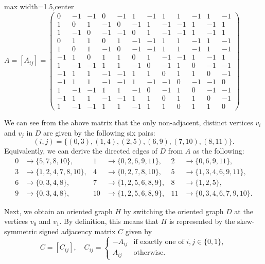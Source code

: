 \documentclass[11pt]{article}
\theoremstyle{definition}
\numberwithin{equation}{section}
\begin{document}
\begin{humanaiblock}
\begin{center}
\setlength{\arraycolsep}{2.5pt} %
\renewcommand{\arraystretch}{0.9} %
\begin{adjustbox}{max width=1.5\textwidth,center}
$\displaystyle
A= [A_{ij}] =
\begin{pmatrix}
 0&-1&-1& 0&-1& 1&-1& 1& 1&-1& 1&-1\\
 1& 0& 1&-1& 0&-1& 1&-1&-1& 1&-1& 1\\
 1&-1& 0&-1&-1& 0& 1&-1&-1& 1&-1& 1\\
 0& 1& 1& 0& 1&-1&-1& 1& 1&-1& 1&-1\\
 1& 0& 1&-1& 0&-1&-1& 1& 1&-1& 1&-1\\
-1& 1& 0& 1& 1& 0& 1&-1&-1& 1&-1& 1\\
 1&-1&-1& 1& 1&-1& 0&-1& 1& 0&-1&-1\\
-1& 1& 1&-1&-1& 1& 1& 0& 1& 1& 0&-1\\
-1& 1& 1&-1&-1& 1&-1&-1& 0&-1&-1& 0\\
 1&-1&-1& 1& 1&-1& 0&-1& 1& 0&-1&-1\\
-1& 1& 1&-1&-1& 1& 1& 0& 1& 1& 0&-1\\
 1&-1&-1& 1& 1&-1& 1& 1& 0& 1& 1& 0
\end{pmatrix}
$
\end{adjustbox}
\end{center}

We can see from the above matrix that the only non-adjacent, distinct vertices $v_i$ and $v_j$ in $D$ are given by the following six pairs: 
\[
(i,j) = \{(0,3), (1,4), (2,5), (6,9), (7,10), (8,11)\}.
\]
Equivalently, we can derive the directed edges of $D$ from $A$ as the following:
\begin{align*}
0&\to\{5,7,8,10\}, &1&\to\{0,2,6,9,11\}, &2&\to\{0,6,9,11\},\\
3&\to\{1,2,4,7,8,10\}, &4&\to\{0,2,7,8,10\}, &5&\to\{1,3,4,6,9,11\},\\
6&\to\{0,3,4,8\}, &7&\to\{1,2,5,6,8,9\}, &8&\to\{1,2,5\},\\
9&\to\{0,3,4,8\}, &10&\to\{1,2,5,6,8,9\}, &11&\to\{0,3,4,6,7,9,10\}.
\end{align*}

Next, we obtain an oriented graph $H$ by switching the oriented graph $D$ at the vertices $v_0$ and $v_1$. By definition, this means that $H$ is represented by the skew-symmetric signed adjacency matrix $C$ given by 
\[
C=[C_{ij}],\quad 
C_{ij}=
\begin{cases}
-A_{ij} & \text{if exactly one of } i,j\in\{0,1\},\\
A_{ij} & \text{otherwise.}
\end{cases}
\]


\end{humanaiblock}
\end{document}
